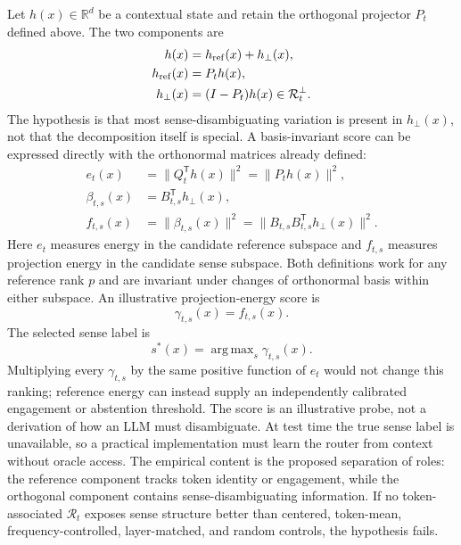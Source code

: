 \documentclass[
  aps,
  reprint,
  superscriptaddress,
  floatfix,
  nofootinbib,
  longbibliography
]{revtex4-2}
\newcommand{\R}{\mathbb{R}}
\newcommand{\T}{^{\mathsf{T}}}
\newcommand{\norm}[1]{\lVert #1 \rVert}
\DeclareMathOperator*{\argmax}{arg\,max}
\begin{document}
Let $h(x)\in\R^d$ be a contextual state and retain the orthogonal projector
$P_t$ defined above. The two components are
%
\begin{align}
\label{eq:reference-decomp}
h(x)&=h_{\rm ref}(x)+h_\perp(x),\\
h_{\rm ref}(x)&=P_t h(x),\nonumber\\
h_\perp(x)&=(I-P_t)h(x)\in\mathcal R_t^\perp.\nonumber
\end{align}
%
The hypothesis is that most sense-disambiguating variation is present in
$h_\perp(x)$, not that the decomposition itself is special.  A
basis-invariant score can be expressed directly with the orthonormal matrices
already defined:
%
\begin{align}
\label{eq:sense-coordinates}
e_t(x)&=\norm{Q_t\T h(x)}^2=\norm{P_t h(x)}^2,\nonumber\\
\beta_{t,s}(x)&=B_{t,s}\T h_\perp(x),\\
f_{t,s}(x)&=\norm{\beta_{t,s}(x)}^2
=\norm{B_{t,s}B_{t,s}\T h_\perp(x)}^2.\nonumber
\end{align}
%
Here $e_t$ measures energy in the candidate reference subspace and $f_{t,s}$
measures projection energy in the candidate sense subspace.  Both definitions
work for any reference rank $p$ and are invariant under changes of orthonormal
basis within either subspace.  An illustrative projection-energy score is
%
\begin{equation}
\label{eq:sense-score}
\gamma_{t,s}(x)=f_{t,s}(x).
\end{equation}
%
The selected sense label is
%
\begin{equation}
\label{eq:selected-sense}
s^*(x)=\argmax_s \gamma_{t,s}(x).
\end{equation}
%
Multiplying every $\gamma_{t,s}$ by the same positive function of $e_t$ would not
change this ranking; reference energy can instead supply an independently
calibrated engagement or abstention threshold.  The score is an illustrative
probe, not a derivation of how an LLM
must disambiguate.  At test time the true sense label is unavailable, so a
practical implementation must learn the router from context without oracle
access.  The empirical content is the proposed separation of roles: the
reference component tracks token identity or engagement, while the orthogonal
component contains sense-disambiguating information. If no token-associated
$\mathcal R_t$ exposes sense structure better than centered, token-mean,
frequency-controlled, layer-matched, and random controls, the hypothesis
fails.
\end{document}
